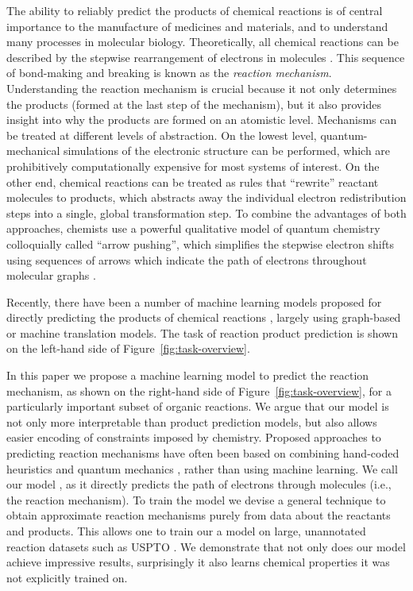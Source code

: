 
The ability to reliably predict the products of chemical reactions is of central importance to the manufacture of medicines and materials, and to understand many processes in molecular biology.
Theoretically, all chemical reactions can be described by the stepwise rearrangement of electrons in molecules \citep{herges1994organizing}. 
This sequence of bond-making and breaking is known as the \emph{reaction mechanism}. 
Understanding the reaction mechanism is crucial because it not only determines the products (formed at the last step of the mechanism), 
but it also provides insight into why the products are formed on an atomistic level. 
%
Mechanisms can be treated at different levels of abstraction. 
On the lowest level, quantum-mechanical simulations of the electronic structure can be performed, which are prohibitively computationally expensive for most systems of interest. 
On the other end, chemical reactions can be treated as rules that ``rewrite'' reactant molecules to products, which abstracts away the individual electron redistribution steps into a single, global transformation step. 
To combine the advantages of both approaches, chemists use a powerful qualitative model of quantum chemistry colloquially called ``arrow pushing'', which simplifies the stepwise electron shifts using sequences of arrows which indicate the path of electrons throughout molecular graphs \citep{herges1994organizing}. 

Recently, there have been a number of machine learning models proposed for directly predicting the products of chemical reactions \citep{coley2017prediction,jin2017predicting,schwaller2017found,neural-symbolic,segler2018planning,wei2016neural}, largely using graph-based or machine translation models. 
The task of reaction product prediction is shown on the left-hand side of Figure~\ref{fig:task-overview}. 

In this paper we propose a machine learning model to predict the reaction mechanism, as shown on the right-hand side of Figure~\ref{fig:task-overview}, for a particularly important subset of organic reactions.
We argue that our model is not only more interpretable than product prediction models, but also allows easier encoding of constraints imposed by chemistry.
Proposed approaches to predicting reaction mechanisms have often been based on combining hand-coded heuristics and quantum mechanics \citep{bergeler2015heuristics,kim2018efficient,nandi2017tabu,segler2017modelling,rappoport2014complex,simm2017context,zimmerman2013automated}, 
rather than using machine learning.
We call our model \ourModel, as it directly predicts the path of electrons through molecules (i.e., the reaction mechanism). 
To train the model we devise a general technique to obtain approximate reaction mechanisms purely from data about the reactants and products. 
This allows one to train our a model on large, unannotated reaction datasets such as USPTO \citep{lowe2012extraction}. We demonstrate that not only does our model achieve impressive results, surprisingly it also learns chemical properties it was not explicitly trained on.



